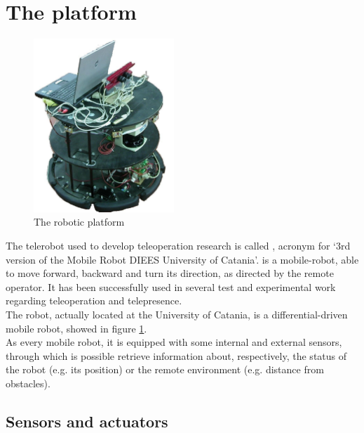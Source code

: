 \section{The \morduc{} platform}
\label{intro:3morduc}

\begin{figure} [h]
  \begin{center}
    \includegraphics[width=150pt]{img/3morduc.jpg}
    \caption{The \morduc{} robotic platform}
    \label{fig:morduc}
  \end{center}
\end{figure}

The telerobot used to develop teleoperation research is
called \morduc{}, acronym for `3rd version of
the Mobile Robot DIEES University of Catania'.
\morduc{} is a mobile-robot, able to move forward, backward
and turn its direction, as directed by the remote operator.
It has been successfully used in several test and experimental
work regarding teleoperation and telepresence.
\\
The robot, actually located at the University of
Catania, is a differential-driven mobile robot, showed
in figure \ref{fig:morduc}.
\\
As every mobile robot, it is equipped with some internal
and external sensors, through which is possible retrieve
information about, respectively, the status of the robot
(e.g. its position) or the remote environment (e.g.
distance from obstacles).

\subsection{Sensors and actuators}
\label{intro:3morduc:sensors_actuators}


